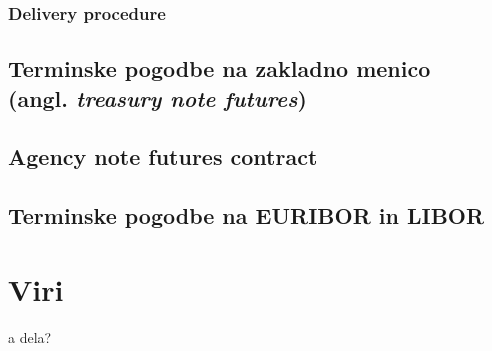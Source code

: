 \documentclass[a4paper, 12pt]{article}
\begin{document}
\subsubsection{Delivery procedure}

\subsection{Terminske pogodbe na zakladno menico \\ (angl. \textit{treasury note futures})}
\subsection{Agency note futures contract}
\subsection{Terminske pogodbe na EURIBOR in LIBOR}

\section{Viri}
\begin{description}
    \item a dela?
\end{description}
\end{document}
